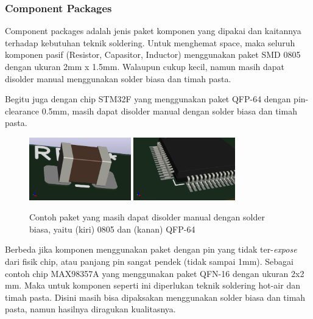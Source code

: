 \documentclass[12pt,]{article}
\begin{document}
	\newpage
	\subsubsection{Component Packages}
	
	Component packages adalah jenis paket komponen yang dipakai dan kaitannya terhadap kebutuhan teknik soldering.
	Untuk menghemat space, maka seluruh komponen pasif (Resistor, Capasitor, Inductor) menggunakan paket SMD 0805 dengan ukuran 2mm x 1.5mm. 
	Walaupun cukup kecil, namun masih dapat disolder manual menggunakan solder biasa dan timah pasta. 
	
	Begitu juga dengan chip STM32F yang menggunakan paket QFP-64 dengan pin-clearance 0.5mm,
	masih dapat disolder manual dengan solder biasa dan timah pasta. 
	
	\begin{figure}[!ht]
		\centering
		\includegraphics[width=125pt]{images/smd_0805}
		\includegraphics[width=125pt]{images/smd_qfp64}
		\caption{Contoh paket yang masih dapat disolder manual dengan solder biasa, yaitu (kiri) 0805 dan (kanan) QFP-64}
	\end{figure}

	Berbeda jika komponen menggunakan paket dengan pin yang tidak ter-\textit{expose} dari fisik chip,
	atau panjang pin sangat pendek (tidak sampai 1mm).
	Sebagai contoh chip MAX98357A yang menggunakan paket QFN-16 dengan ukuran 2x2 mm.
	Maka untuk komponen seperti ini diperlukan teknik soldering hot-air dan timah pasta.
	Disini masih bisa dipaksakan menggunakan solder biasa dan timah pasta, namun hasilnya diragukan kualitasnya.
	
\end{document}
